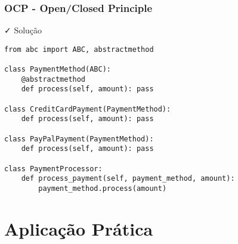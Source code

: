 \documentclass[aspectratio=169]{beamer}
\begin{document}
\begin{frame}[fragile]
\frametitle{OCP - Open/Closed Principle}
\begin{block}{\textcolor{cleangreen}{\faCheck} Solução}
\scriptsize
\begin{lstlisting}
from abc import ABC, abstractmethod

class PaymentMethod(ABC):
    @abstractmethod
    def process(self, amount): pass

class CreditCardPayment(PaymentMethod):
    def process(self, amount): pass

class PayPalPayment(PaymentMethod):
    def process(self, amount): pass

class PaymentProcessor:
    def process_payment(self, payment_method, amount):
        payment_method.process(amount)
\end{lstlisting}
\end{block}
\end{frame}

\section{Aplicação Prática}
\end{document}
